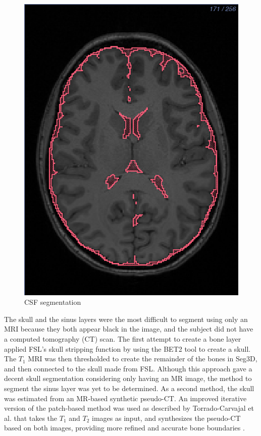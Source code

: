 \begin{figure}[H]
\begin{center}
\includegraphics[width=.49\textwidth]{Figures/CSF_seg}
\caption{CSF segmentation}
\label{fig:csf}
\end{center}
\end{figure}

The skull and the sinus layers were the most difficult to segment using only an MRI because they both appear black in the image, and the subject did not have a computed tomography (CT) scan. The first attempt to create a bone layer applied FSL's skull stripping function by using the BET2 tool to create a skull. The $T_1$ MRI was then thresholded to create the remainder of the bones in Seg3D, and then connected to the skull made from FSL. Although this approach gave a decent skull segmentation considering only having an MR image, the method to segment the sinus layer was yet to be determined. As a second method, the skull was estimated from an MR-based synthetic pseudo-CT. An improved iterative version of the patch-based method was used as described by Torrado-Carvajal et al. that takes the $T_1$ and $T_2$ images as input, and synthesizes the pseudo-CT based on both images, providing more refined and accurate bone boundaries \cite{ref:pseudoct}. 

